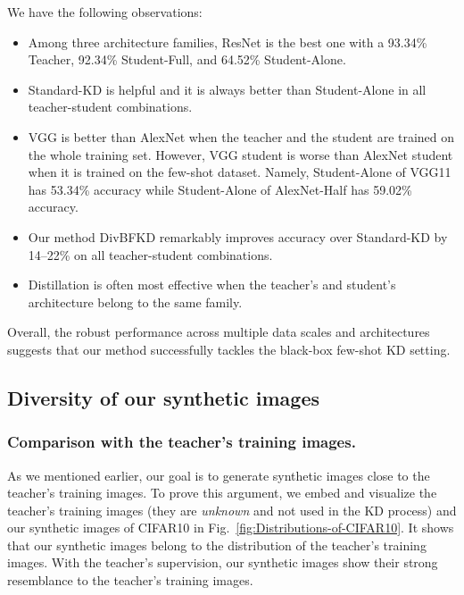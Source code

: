 \begin{foldable}
  We have the following observations:
  \begin{itemize}
    \item Among three architecture families, ResNet is the best one with a 93.34\% Teacher, 92.34\% Student-Full, and 64.52\% Student-Alone.
    \item Standard-KD is helpful and it is always better than Student-Alone in all teacher-student combinations.
    \item {
        VGG is better than AlexNet when the teacher and the student are trained on the whole training set.
        However, VGG student is worse than AlexNet student when it is trained on the few-shot dataset.
        Namely, Student-Alone of VGG11 has 53.34\% accuracy while Student-Alone of AlexNet-Half has 59.02\% accuracy.
      }
    \item Our method DivBFKD remarkably improves accuracy over Standard-KD by 14--22\% on all teacher-student combinations.
    \item Distillation is often most effective when the teacher's and student's architecture belong to the same family.
  \end{itemize}
  Overall, the robust performance across multiple data scales and architectures suggests that our method successfully tackles the black-box few-shot KD setting.
\end{foldable}

\subsection{Diversity of our synthetic images}

\subsubsection{Comparison with the teacher's training images.}

\begin{foldable}
  As we mentioned earlier, our goal is to generate synthetic images close to the teacher's training images.
  To prove this argument, we embed and visualize the teacher's training images (they are \textit{unknown} and not used in the KD process) and our synthetic images of CIFAR10 in Fig.~\ref{fig:Distributions-of-CIFAR10}.
  It shows that our synthetic images belong to the distribution of the teacher's training images.
  With the teacher's supervision, our synthetic images show their strong resemblance to the teacher's training images.
\end{foldable}

